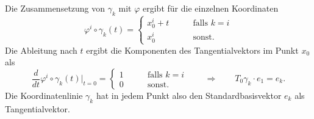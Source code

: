 Die Zusammensetzung von $\gamma_k$ mit $\varphi$ ergibt für die
einzelnen Koordinaten
\[
\varphi^i\circ\gamma_k(t)
=
\begin{cases}
x_0^i+t&\qquad\text{falls $k=i$} \\
x_0^i  &\qquad\text{sonst}.
\end{cases}
\]
Die Ableitung nach $t$ ergibt die Komponenten des Tangentialvektors im
Punkt $x_0$ als
\[
\frac{d}{dt}\varphi^i\circ\gamma_k(t)
\bigg|_{t=0}
=
\begin{cases}
1&\qquad \text{falls $k=i$}\\
0&\qquad\text{sonst.}
\end{cases}
\qquad\Rightarrow\qquad
T_0\gamma_k \cdot e_1 = e_k.
\]
Die Koordinatenlinie $\gamma_k$ hat in jedem Punkt also den
Standardbasisvektor $e_k$ als Tangentialvektor.

